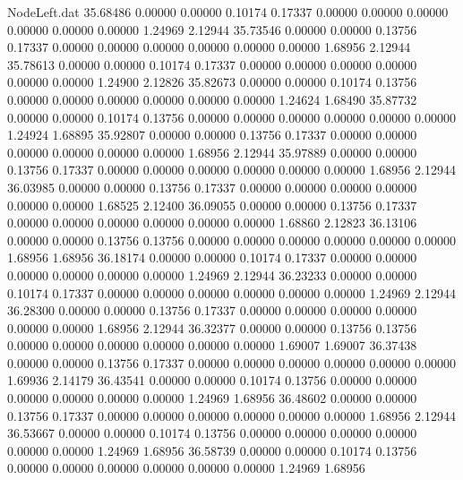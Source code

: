 \begin{filecontents}{NodeLeft.dat}
  35.68486    0.00000    0.00000     0.10174    0.17337    0.00000    0.00000    0.00000    0.00000    0.00000    0.00000    1.24969    2.12944
  35.73546    0.00000    0.00000     0.13756    0.17337    0.00000    0.00000    0.00000    0.00000    0.00000    0.00000    1.68956    2.12944
  35.78613    0.00000    0.00000     0.10174    0.17337    0.00000    0.00000    0.00000    0.00000    0.00000    0.00000    1.24900    2.12826
  35.82673    0.00000    0.00000     0.10174    0.13756    0.00000    0.00000    0.00000    0.00000    0.00000    0.00000    1.24624    1.68490
  35.87732    0.00000    0.00000     0.10174    0.13756    0.00000    0.00000    0.00000    0.00000    0.00000    0.00000    1.24924    1.68895
  35.92807    0.00000    0.00000     0.13756    0.17337    0.00000    0.00000    0.00000    0.00000    0.00000    0.00000    1.68956    2.12944
  35.97889    0.00000    0.00000     0.13756    0.17337    0.00000    0.00000    0.00000    0.00000    0.00000    0.00000    1.68956    2.12944
  36.03985    0.00000    0.00000     0.13756    0.17337    0.00000    0.00000    0.00000    0.00000    0.00000    0.00000    1.68525    2.12400
  36.09055    0.00000    0.00000     0.13756    0.17337    0.00000    0.00000    0.00000    0.00000    0.00000    0.00000    1.68860    2.12823
  36.13106    0.00000    0.00000     0.13756    0.13756    0.00000    0.00000    0.00000    0.00000    0.00000    0.00000    1.68956    1.68956
  36.18174    0.00000    0.00000     0.10174    0.17337    0.00000    0.00000    0.00000    0.00000    0.00000    0.00000    1.24969    2.12944
  36.23233    0.00000    0.00000     0.10174    0.17337    0.00000    0.00000    0.00000    0.00000    0.00000    0.00000    1.24969    2.12944
  36.28300    0.00000    0.00000     0.13756    0.17337    0.00000    0.00000    0.00000    0.00000    0.00000    0.00000    1.68956    2.12944
  36.32377    0.00000    0.00000     0.13756    0.13756    0.00000    0.00000    0.00000    0.00000    0.00000    0.00000    1.69007    1.69007
  36.37438    0.00000    0.00000     0.13756    0.17337    0.00000    0.00000    0.00000    0.00000    0.00000    0.00000    1.69936    2.14179
  36.43541    0.00000    0.00000     0.10174    0.13756    0.00000    0.00000    0.00000    0.00000    0.00000    0.00000    1.24969    1.68956
  36.48602    0.00000    0.00000     0.13756    0.17337    0.00000    0.00000    0.00000    0.00000    0.00000    0.00000    1.68956    2.12944
  36.53667    0.00000    0.00000     0.10174    0.13756    0.00000    0.00000    0.00000    0.00000    0.00000    0.00000    1.24969    1.68956
  36.58739    0.00000    0.00000     0.10174    0.13756    0.00000    0.00000    0.00000    0.00000    0.00000    0.00000    1.24969    1.68956

\end{filecontents}
